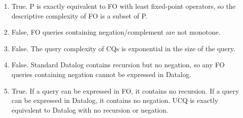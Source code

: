 \documentclass[12pt]{article}
\begin{document}
\begin{enumerate}
\item %
True. P is exactly equivalent to FO with least fixed-point operators,
so the descriptive complexity of FO is a subset of P.
\item %
False, FO queries containing negation/complement are not monotone.
\item %
False. The query complexity of CQs is exponential in the size of the
query.
\item %
False. Standard Datalog contains recursion but no negation,
so any FO queries containing negation cannot be expressed in Datalog.
\item %
True. If a query can be expressed in FO, it contains no recursion. If a
query can be expressed in Datalog, it contains no negation. UCQ is exactly
equivalent to Datalog with no recursion or negation.

\end{enumerate}
\end{document}
